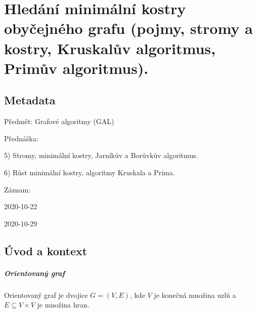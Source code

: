 

\graphicspath{{gal/hledani_minimalni_kostry}}


\chapter{Hledání minimální kostry obyčejného grafu (pojmy, stromy a kostry, Kruskalův algoritmus, Primův algoritmus).}


\section{Metadata}

\begin{compactitem}
    \item Předmět: Grafové algoritmy (GAL)
    \item Přednáška:
    \begin{compactitem}
        \item 5) Stromy, minimální kostry, Jarníkův a Borůvkův algoritmus.
        \item 6) Růst minimální kostry, algoritmy Kruskala a Prima.
    \end{compactitem}
    \item Záznam:
    \begin{compactitem}
        \item 2020-10-22
        \item 2020-10-29
    \end{compactitem}
\end{compactitem}


\section{Úvod a kontext}

\paragraph*{Orientovaný graf} Orientovaný graf je dvojice $G = (V, E)$, kde $V$ je konečná množina uzlů a $E \subseteq V \times V$ je množina hran.

